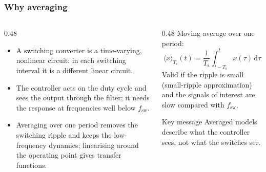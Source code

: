 \begin{frame}
	\frametitle{Why averaging}
	\begin{columns}[T]
		\begin{column}{0.48\textwidth}
			\small
			\begin{itemize}
				\item A switching converter is a time-varying, nonlinear circuit: in each switching interval it is a different linear circuit.
				\item The controller acts on the duty cycle and sees the output through the filter; it needs the response at frequencies well below $f_\mathrm{sw}$.
				\item Averaging over one period removes the switching ripple and keeps the low-frequency dynamics; linearising around the operating point gives transfer functions.
			\end{itemize}
		\end{column}
		\begin{column}{0.48\textwidth}
			\small
			Moving average over one period:
			\begin{equation*}
				\langle x\rangle_{T_\mathrm{s}}(t)=\frac{1}{T_\mathrm{s}}\int_{t-T_\mathrm{s}}^{t}x(\tau)\,\mathrm{d}\tau
			\end{equation*}
			Valid if the ripple is small (small-ripple approximation) and the signals of interest are slow compared with $f_\mathrm{sw}$.
			\begin{block}{Key message}
				Averaged models describe what the controller sees, not what the switches see.
			\end{block}
		\end{column}
	\end{columns}
\end{frame}

